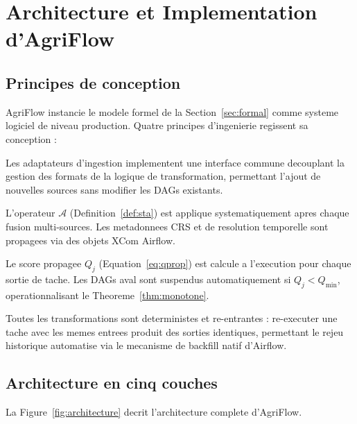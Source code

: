 \documentclass[12pt,a4paper]{article}
\theoremstyle{plain}
\theoremstyle{definition}
\theoremstyle{remark}
\begin{document}
	\section{Architecture et Implementation d'AgriFlow}
	\label{sec:architecture}
	
	\subsection{Principes de conception}
	
	AgriFlow instancie le modele formel de la Section~\ref{sec:formal}
	comme systeme logiciel de niveau production. Quatre principes
	d'ingenierie regissent sa conception :
	
	\begin{description}[leftmargin=1.5em,style=nextline]
		\item[Agnosticisme aux sources.]
		Les adaptateurs d'ingestion implementent une interface commune
		decouplant la gestion des formats de la logique de transformation,
		permettant l'ajout de nouvelles sources sans modifier les DAGs existants.
		\item[Alignement spatio-temporel premier.]
		L'operateur $\mathcal{A}$ (Definition~\ref{def:sta}) est applique
		systematiquement apres chaque fusion multi-sources. Les metadonnees
		CRS et de resolution temporelle sont propagees via des objets XCom Airflow.
		\item[Execution guidee par la qualite.]
		Le score propagee $Q_j$ (Equation~\ref{eq:qprop}) est calcule a
		l'execution pour chaque sortie de tache. Les DAGs aval sont suspendus
		automatiquement si $Q_j < Q_{\min}$, operationnalisant le
		Theoreme~\ref{thm:monotone}.
		\item[Idempotence et backfill.]
		Toutes les transformations sont deterministes et re-entrantes :
		re-executer une tache avec les memes entrees produit des sorties
		identiques, permettant le rejeu historique automatise via
		le mecanisme de backfill natif d'Airflow.
	\end{description}
	
	\subsection{Architecture en cinq couches}
	
	La Figure~\ref{fig:architecture} decrit l'architecture complete d'AgriFlow.
	
\end{document}
